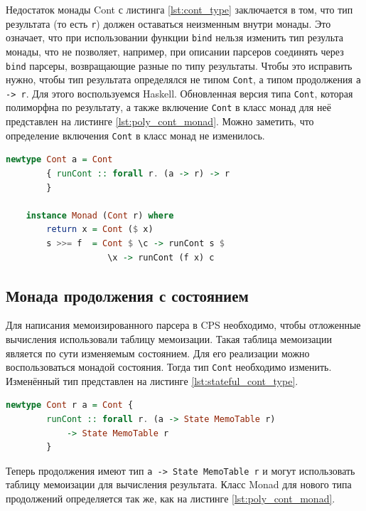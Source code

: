 \documentclass[times]{itmo-student-thesis}
\begin{document}
Недостаток монады Cont с листинга \ref{lst:cont_type} заключается в том, что тип результата (то есть
\lstinline{r}) должен оставаться  неизменным внутри монады. Это означает, что при использовании функции \lstinline{bind} нельзя изменить 
тип результа монады, что не позволяет, например, при описании парсеров соединять через \lstinline{bind} парсеры,
возвращающие разные по типу результаты. Чтобы это исправить нужно, чтобы тип результата определялся не типом
\lstinline{Cont}, а типом продолжения \lstinline{a -> r}. Для этого воспользуемся Haskell.
Обновленная версия типа \lstinline{Cont}, которая полиморфна по результату, а также включение \lstinline{Cont} в класс монад
для неё  представлен  на листинге \ref{lst:poly_cont_monad}. Можно заметить, что определение включения \lstinline{Cont} 
в класс монад не изменилось.

\begin{lstlisting}[language=Haskell,float=!h,caption={Монада продолжения полиморфная по результату},label={lst:poly_cont_monad}]
    newtype Cont a = Cont
        { runCont :: forall r. (a -> r) -> r
        }

    instance Monad (Cont r) where
        return x = Cont ($ x)
        s >>= f  = Cont $ \c -> runCont s $ 
                    \x -> runCont (f x) c
\end{lstlisting}

\subsection{Монада продолжения с состоянием}\label{sec:stateful_cont}

Для написания мемоизированного парсера в CPS необходимо, чтобы отложенные вычисления использовали таблицу мемоизации. 
Такая таблица мемоизации является по сути изменяемым состоянием. Для его реализации можно воспользоваться монадой состояния.
Тогда тип \lstinline{Cont} необходимо изменить. Изменённый тип представлен на листинге \ref{lst:stateful_cont_type}.

\begin{lstlisting}[language=Haskell,float=!h,caption={Тип Cont с состоянием},label={lst:stateful_cont_type}]
    newtype Cont r a = Cont { 
        runCont :: forall r. (a -> State MemoTable r) 
            -> State MemoTable r 
        }
\end{lstlisting}

Теперь продолжения имеют тип \lstinline{a -> State MemoTable r} и могут использовать таблицу мемоизации для вычисления результата.
Класс Monad для нового типа продолжений определяется так же, как на листинге \ref{lst:poly_cont_monad}.
\end{document}
